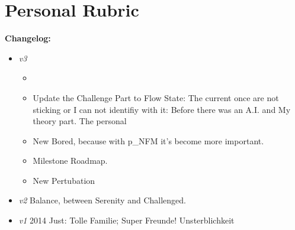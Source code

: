 \chapter{Personal Rubric}
\setcounter{section}{0}

\textbf{Changelog:}\\
\begin{itemize}
	\item \textit{v3} 
	\begin{itemize}
	\item 	{}
	\item Update the Challenge Part to Flow State: The current once are not sticking or I can not identifiy with it: Before there was an A.I. and  My theory part. The personal
	\item New Bored, because with \gls{p_NFM} it's become more important.
	\item Milestone Roadmap.
	\item New Pertubation
	\end{itemize}
	\item \textit{v2} Balance, between Serenity and Challenged.
	\item \textit{v1} 2014 Just: Tolle Familie; Super Freunde! Unsterblichkeit
\end{itemize}

\pagebreak
